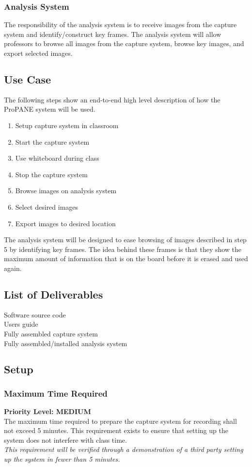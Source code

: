 \documentclass[]{article}
\begin{document}
			\subsubsection{Analysis System}
				The responsibility of the analysis system is to receive images from the capture system and identify/construct key frames. The analysis system will allow professors to browse all images from the capture system, browse key images, and export selected images. 
				
		\subsection{Use Case}
			The following steps show an end-to-end high level description of how the ProPANE system will be used.
			\begin{enumerate}
				\item Setup capture system in classroom
				\item Start the capture system
				\item Use whiteboard during class
				\item Stop the capture system 
				\item Browse images on analysis system
				\item Select desired images
				\item Export images to desired location
			\end{enumerate}			
			The analysis system will be designed to ease browsing of images described in step 5 by identifying key frames. The idea behind these frames is that they show the maximum amount of information that is on the board before it is erased and used again. 
			
	
		\subsection{List of Deliverables}
		
			Software source code\\
			Users guide\\
			Fully assembled capture system\\
			Fully assembled/installed analysis system\\
		
		\subsection{Setup}
				
			\subsubsection{Maximum Time Required}
				\textbf{Priority Level: MEDIUM}\\
				The maximum time required to prepare the capture system for recording shall not exceed 5 minutes. This requirement exists to ensure that setting up the system does not interfere with class time.\\
				\emph{This requirement will be verified through a demonstration of a third party setting up the system in fewer than 5 minutes.}
		
\end{document}
